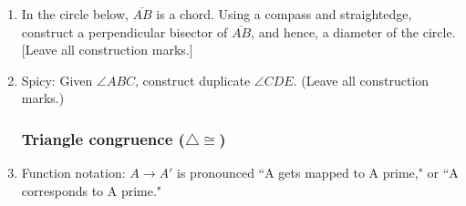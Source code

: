 \documentclass[12pt, twoside]{article}
\begin{document}
\begin{enumerate}
\newpage
    \item In the circle below, $\overline{AB}$ is a chord. Using a compass and straightedge, construct a perpendicular bisector of $\overline{AB}$, and hence, a diameter of the circle. [Leave all construction marks.]\\[4cm]
    \begin{center}
    \end{center}

\newpage
  \item Spicy: Given $\angle ABC$, construct duplicate $\angle CDE$. (Leave all construction marks.)
    \begin{center}
    \end{center}

\newpage
\subsubsection*{Triangle congruence ($\triangle \cong$)}

  \item Function notation: $A \rightarrow A'$ is pronounced ``A gets mapped to A prime," or ``A corresponds to A prime."


\end{enumerate}
\end{document}
